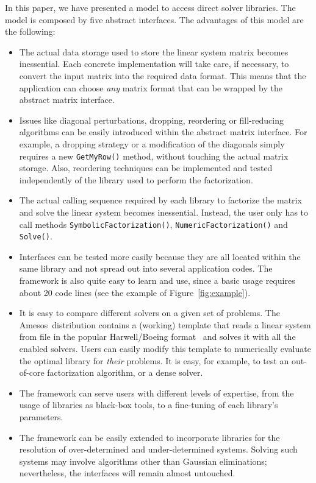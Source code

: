\documentclass[acmtocl]{acmtrans2m}
\newcommand{\amesos}{{\sc Amesos}}
\begin{document}
In this paper, we have presented a model to access direct
solver libraries. The model is composed by five abstract interfaces.
The advantages of this model are the following:
\begin{itemize}

\item The actual data storage used to store the linear system matrix becomes inessential.
Each concrete implementation will take care, if necessary, to convert the
input matrix into the required data format. This means that the
application can choose {\sl any} matrix format that can be wrapped by the
abstract matrix interface.

\item Issues like diagonal perturbations, dropping, reordering or
fill-reducing algorithms 
can be easily introduced within the abstract matrix interface.
For example, a dropping strategy or a modification of the diagonals simply
requires a new \verb!GetMyRow()! method, without touching the actual matrix
storage. Also, reordering techniques can be implemented and tested
independently of the library used to perform the factorization.

\item The actual calling sequence required by each library to factorize the
matrix and solve the linear system becomes inessential. Instead, the user only
has to call methods \verb!SymbolicFactorization()!, \verb!NumericFactorization()! and
\verb!Solve()!.

\item Interfaces can be tested more easily because they are all located within
the same library and not spread out into several application codes. The
framework is also quite easy to learn and use, since a basic usage 
requires about 20 code lines (see the example of Figure~\ref{fig:example}).

\item It is easy to compare different solvers on a given set of problems. The
\amesos\ distribution contains a (working) template that reads a linear system
from file in the popular Harwell/Boeing format~\cite{duff89sparse} and solves it with all the
enabled solvers. Users can easily modify this template to numerically evaluate
the optimal library for {\sl their} problems.
It is easy, for example, to test an out-of-core factorization algorithm, or a
dense solver.

\item
The framework can serve users with different levels of expertise, from the
usage of libraries as black-box tools, to a fine-tuning of each library's
parameters.

\item 
The framework can be easily extended to incorporate libraries for the
resolution of over-determined and under-determined systems. Solving such
systems may involve algorithms other than Gaussian eliminations; nevertheless,
the interfaces will remain almost untouched.

\end{itemize}
\end{document}
